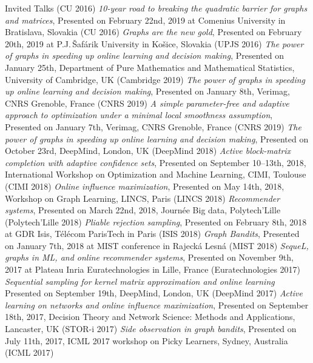 \documentclass{resume}
\begin{document}
\begin{category}{Invited Talks}
({\sf CU 2016})
\citembullet
\emph{10-year road to breaking the quadratic barrier for graphs and matrices}, Presented on February 22nd, 2019 at Comenius University in Bratislava, Slovakia 
({\sf CU 2016})
\citembullet
\emph{Graphs are the new gold}, Presented on February 20th, 2019 at P.J.\,\v{S}af\'arik University in Ko\v{s}ice, Slovakia
({\sf UPJS 2016})
\citembullet
\emph{The power of graphs in speeding up online learning and decision making},
Presented on January 25th, Department of Pure Mathematics and Mathematical Statistics, University of Cambridge, UK
({\sf Cambridge  2019})
\citembullet
\emph{The power of graphs in speeding up online learning and decision making},
Presented on January 8th, Verimag, CNRS Grenoble, France
({\sf CNRS  2019})
\citembullet
\emph{A simple parameter-free and adaptive approach to optimization under a minimal local smoothness assumption},
Presented on January 7th, Verimag, CNRS Grenoble, France
({\sf CNRS  2019})
\citembullet
\emph{The power of graphs in speeding up online learning and decision making},
Presented on October 23rd, DeepMind, London, UK
({\sf DeepMind  2018})
\citembullet
\emph{Active block-matrix completion with adaptive confidence sets},  Presented on September 10--13th, 2018,  International Workshop  on Optimization and Machine Learning, CIMI, Toulouse ({\sf CIMI 2018})
\citembullet
\emph{Online influence maximization},  Presented on May 14th, 2018, Workshop on Graph Learning, LINCS, Paris ({\sf LINCS 2018})
\citembullet
\emph{Recommender systems},  Presented on March 22nd, 2018, Journ\' ee Big data, Polytech'Lille ({\sf Polytech'Lille 2018})
\citembullet
\emph{Pliable rejection sampling}, Presented on February 8th, 2018 at GDR Isis, T\' el\' ecom ParisTech in Paris ({\sf ISIS 2018})
\citembullet
\emph{Graph Bandits}, Presented on January 7th, 2018 at MIST conference in Rajeck\' a Lesn\' a ({\sf MIST 2018})
\citembullet
\emph{SequeL, graphs in ML, and online recommender systems}, Presented on November 9th, 2017 at Plateau Inria Euratechnologies in Lille, France  
({\sf Euratechnologies 2017})
\citembullet
\emph{Sequential sampling for kernel matrix approximation and online learning}
Presented on September 19th, DeepMind, London, UK
({\sf DeepMind  2017})
\citembullet
\emph{Active learning on networks and online influence maximization}, Presented on  September 18th, 2017, Decision Theory and Network Science: Methods and Applications, Lancaster, UK 
({\sf STOR-i  2017})
\citembullet
\emph{Side observation in graph bandits}, Presented on July 11th, 2017, ICML 2017 workshop on Picky Learners, Sydney, Australia ({\sf ICML 2017})

\end{category}
\end{document}
